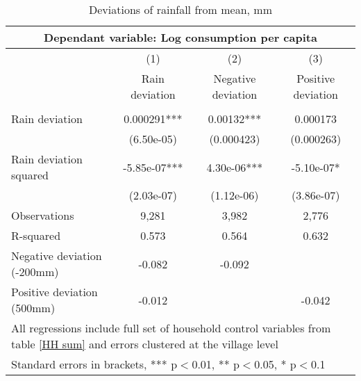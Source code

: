 \begin{table}
\centering
\caption{Deviations of rainfall from mean, mm} \label{Rain dev}
\begin{tabular}{lccc} \multicolumn{4}{c}{Dependant variable: Log consumption per capita} \\\hline
 & (1) & (2) & (3) \\
  & Rain  deviation & Negative   deviation  & Positive   deviation \\ \hline
 &  &  &    \\
Rain deviation  & 0.000291*** & 0.00132*** & 0.000173 \\
 & (6.50e-05) & (0.000423) & (0.000263) \\
Rain deviation squared  & -5.85e-07*** & 4.30e-06*** & -5.10e-07* \\
 & (2.03e-07) & (1.12e-06) & (3.86e-07) \\
 Observations & 9,281 & 3,982 & 2,776 \\
R-squared & 0.573 & 0.564 & 0.632 \\ \hline
Negative deviation (-200mm) & -0.082 & -0.092 & \\
Positive deviation (500mm) & -0.012 & & -0.042 \\
\hline
\multicolumn{4}{p{13cm}}{All regressions include full set of household control variables from table \ref{HH sum} and errors clustered at the village level} \\
\multicolumn{4}{l}{ Standard errors in brackets, *** p$<$0.01, ** p$<$0.05, * p$<$0.1} \\
\end{tabular}
\end{table}